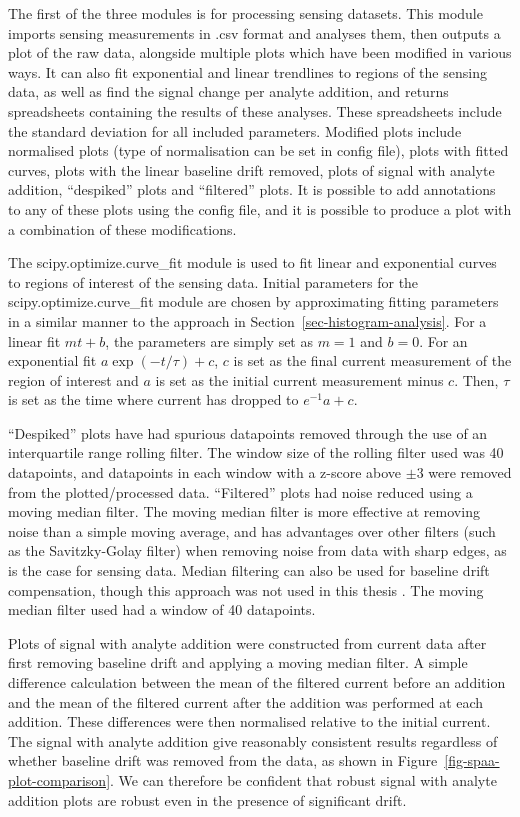 \documentclass[
  a4paper,
]{scrbook}
\begin{document}
The first of the three modules is for processing sensing datasets. This
module imports sensing measurements in .csv format and analyses them,
then outputs a plot of the raw data, alongside multiple plots which have
been modified in various ways. It can also fit exponential and linear
trendlines to regions of the sensing data, as well as find the signal
change per analyte addition, and returns spreadsheets containing the
results of these analyses. These spreadsheets include the standard
deviation for all included parameters. Modified plots include normalised
plots (type of normalisation can be set in config file), plots with
fitted curves, plots with the linear baseline drift removed, plots of
signal with analyte addition, ``despiked'' plots and ``filtered'' plots.
It is possible to add annotations to any of these plots using the config
file, and it is possible to produce a plot with a combination of these
modifications.

The scipy.optimize.curve\_fit module is used to fit linear and
exponential curves to regions of interest of the sensing data. Initial
parameters for the scipy.optimize.curve\_fit module are chosen by
approximating fitting parameters in a similar manner to the approach in
Section~\ref{sec-histogram-analysis}. For a linear fit \(mt + b\), the
parameters are simply set as \(m=1\) and \(b=0\). For an exponential fit
\(a\exp{(-t/\tau)} + c\), \(c\) is set as the final current measurement
of the region of interest and \(a\) is set as the initial current
measurement minus \(c\). Then, \(\tau\) is set as the time where current
has dropped to \(e^{-1}a + c\).

``Despiked'' plots have had spurious datapoints removed through the use
of an interquartile range rolling filter. The window size of the rolling
filter used was 40 datapoints, and datapoints in each window with a
z-score above \(\pm 3\) were removed from the plotted/processed data.
``Filtered'' plots had noise reduced using a moving median filter. The
moving median filter is more effective at removing noise than a simple
moving average, and has advantages over other filters (such as the
Savitzky-Golay filter) when removing noise from data with sharp edges,
as is the case for sensing data. Median filtering can also be used for
baseline drift compensation, though this approach was not used in this
thesis \autocite{Stone2011}. The moving median filter used had a window
of 40 datapoints.

Plots of signal with analyte addition were constructed from current data
after first removing baseline drift and applying a moving median filter.
A simple difference calculation between the mean of the filtered current
before an addition and the mean of the filtered current after the
addition was performed at each addition. These differences were then
normalised relative to the initial current. The signal with analyte
addition give reasonably consistent results regardless of whether
baseline drift was removed from the data, as shown in
Figure~\ref{fig-spaa-plot-comparison}. We can therefore be confident
that robust signal with analyte addition plots are robust even in the
presence of significant drift.
\end{document}
